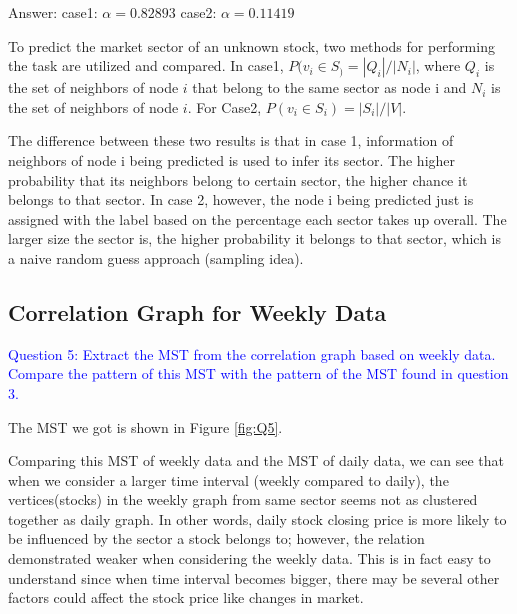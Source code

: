 \documentclass[11pt]{article}
\begin{document}
Answer:
case1: $\alpha = 0.82893$
case2: $\alpha = 0.11419$

To predict the market sector of an unknown stock, two methods for performing the task are utilized and compared. In case1, $P(v_i \in S_) = |Q_i| / |N_i|$, where $Q_i$ is the set of neighbors of node $i$ that belong to the same sector as node i and $N_i$ is the set of neighbors of node $i$. For Case2, $P(v_i \in S_i) = |S_i| / |V|$. 

The difference between these two results is that in case 1, information of neighbors of node i being predicted is used to infer its sector. The higher probability that its neighbors belong to certain sector, the higher chance it belongs to that sector. In case 2, however, the node i being predicted just is assigned with the label based on the percentage each sector takes up overall. The larger size the sector is, the higher probability it belongs to that sector, which is a naive random guess approach (sampling idea).



\subsection{Correlation Graph for Weekly Data}

\textcolor{blue}{Question 5: Extract the MST from the correlation graph based on weekly data. Compare the pattern of this MST with the pattern of the MST found in question 3.
}

The MST we got is shown in Figure \ref {fig:Q5}. 

Comparing this MST of weekly data and the MST of daily data, we can see that when we consider a larger time interval (weekly compared to daily), the vertices(stocks) in the weekly graph from same sector seems not as clustered together as daily graph. In other words, daily stock closing price is more likely to be influenced by the sector a stock belongs to; however, the relation demonstrated weaker when considering the weekly data. This is in fact easy to understand since when time interval becomes bigger, there may be several other factors could affect the stock price like changes in market.
\end{document}

